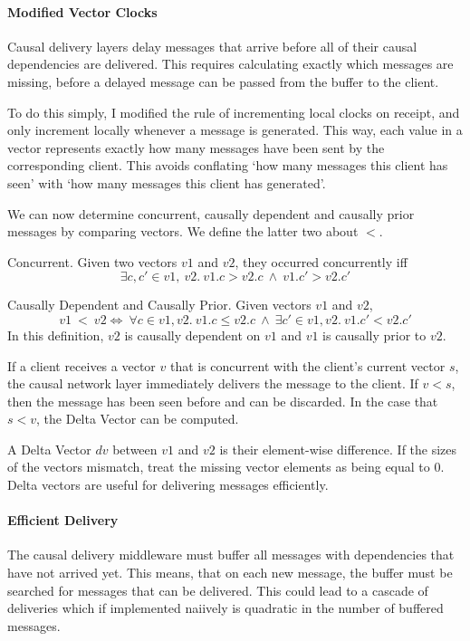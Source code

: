 \documentclass[12pt,a4paper,twoside,openright]{report}
\begin{document}
		\paragraph{Modified Vector Clocks}
		Causal delivery layers delay messages that arrive before all of their causal dependencies are delivered. This requires calculating exactly which messages are missing, before a delayed message can be passed from the buffer to the client.
		
		To do this simply, I modified the rule of incrementing local clocks on receipt, and only increment locally whenever a message is generated. This way, each value in a vector represents exactly how many messages have been sent by the corresponding client. This avoids conflating `how many messages this client has seen' with `how many messages this client has generated'.
		
		We can now determine concurrent, causally dependent and causally prior messages by comparing vectors. We define the latter two about $<$.
		
		Concurrent. Given two vectors $v1$ and $v2$, they occurred concurrently iff \[\exists c,c' \in v1,\ v2.\ v1.c > v2.c\ \land\ v1.c' > v2.c'\]
		
		Causally Dependent and Causally Prior. Given vectors $v1$ and $v2$, \[v1\ <\ v2 \iff\ \forall c \in v1, v2.\ v1.c \leq v2.c\ \land\ \exists c' \in v1, v2.\ v1.c' < v2.c'\]
		In this definition, $v2$ is causally dependent on $v1$ and $v1$ is causally prior to $v2$.
		
		If a client receives a vector $v$ that is concurrent with the client's current vector $s$, the causal network layer immediately delivers the message to the client. If $v < s$, then the message has been seen before and can be discarded. In the case that $s < v$, the Delta Vector can be computed.
		
		A Delta Vector $dv$ between $v1$ and $v2$ is their element-wise difference. If the sizes of the vectors mismatch, treat the missing vector elements as being equal to 0. Delta vectors are useful for delivering messages efficiently.
		
		
		\paragraph{Efficient Delivery}
		The causal delivery middleware must buffer all messages with dependencies that have not arrived yet. This means, that on each new message, the buffer must be searched for messages that can be delivered. This could lead to a cascade of deliveries which if implemented naiively is quadratic in the number of buffered messages.
		
\end{document}
